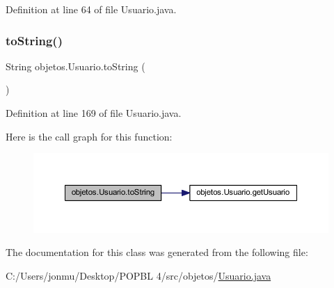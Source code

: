 Definition at line 64 of file Usuario.\+java.

\mbox{\label{classobjetos_1_1_usuario_a60bfdc7b6f95b380ed50723c1e9b1cc6}} 
\subsubsection{\texorpdfstring{to\+String()}{toString()}}
{\footnotesize\ttfamily String objetos.\+Usuario.\+to\+String (\begin{DoxyParamCaption}{ }\end{DoxyParamCaption})}



Definition at line 169 of file Usuario.\+java.

Here is the call graph for this function\+:\nopagebreak
\begin{figure}[H]
\begin{center}
\leavevmode
\includegraphics[width=350pt]{classobjetos_1_1_usuario_a60bfdc7b6f95b380ed50723c1e9b1cc6_cgraph}
\end{center}
\end{figure}


The documentation for this class was generated from the following file\+:\begin{DoxyCompactItemize}
\item 
C\+:/\+Users/jonmu/\+Desktop/\+P\+O\+P\+B\+L 4/src/objetos/\mbox{\hyperlink{_usuario_8java}{Usuario.\+java}}\end{DoxyCompactItemize}

